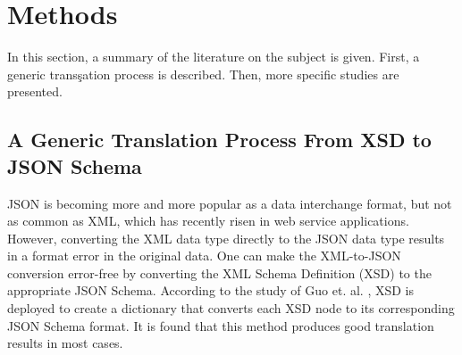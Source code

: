 \section{Methods}
In this section, a summary of the literature on the subject is given. First, a
generic transşation process is described. Then, more specific studies are
presented.

\subsection{A Generic Translation Process From XSD to JSON Schema}
JSON is becoming more and more popular as a data interchange format, but not as
common as XML, which has recently risen in web service applications. However,
converting the XML data type directly to the JSON data type results in a format
error in the original data. One can make the XML-to-JSON conversion error-free
by converting the XML Schema Definition (XSD) to the appropriate JSON Schema.
According to the study of Guo et. al. \autocite{Guo2017}, XSD is deployed to
create a dictionary that converts each XSD node to its corresponding JSON Schema
format. It is found that this method produces good translation results in most
cases.

